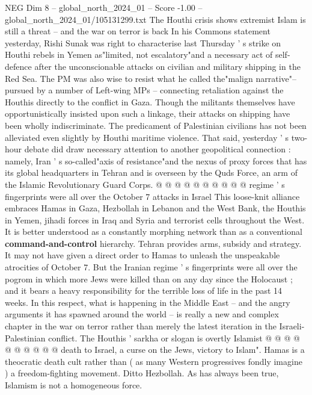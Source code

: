 \begin{textsample}{NEG Dim 8 – global\_north\_2024\_01 – Score -1.00 – global\_north\_2024\_01/105131299.txt}  \label{ex:f8_neg_274}
The Houthi crisis shows extremist Islam is still a threat -- and the war on terror is back In his Commons statement yesterday, Rishi Sunak was right to characterise last Thursday ' s strike on Houthi rebels in Yemen as"limited, not escalatory"and a necessary act of self-defence after the unconscionable attacks on civilian and military shipping in the Red Sea.
The PM was also wise to resist what he called the"malign narrative"-- pursued by a number of Left-wing MPs -- connecting retaliation against the Houthis directly to the conflict in Gaza.
Though the militants themselves have opportunistically insisted upon such a linkage, their attacks on shipping have been wholly indiscriminate.
The predicament of Palestinian civilians has not been alleviated even slightly by Houthi maritime violence.
That said, yesterday ' s two-hour debate did draw necessary attention to another geopolitical connection : namely, Iran ' s so-called"axis of resistance"and the nexus of proxy forces that has its global headquarters in Tehran and is overseen by the Quds Force, an arm of the Islamic Revolutionary Guard Corps. @ @ @ @ @ @ @ @ @ @ regime ' s fingerprints were all over the October 7 attacks in Israel This loose-knit alliance embraces Hamas in Gaza, Hezbollah in Lebanon and the West Bank, the Houthis in Yemen, jihadi forces in Iraq and Syria and terrorist cells throughout the West.
It is better understood as a constantly morphing network than as a conventional \textbf{command-and-control} hierarchy.
Tehran provides arms, subsidy and strategy.
It may not have given a direct order to Hamas to unleash the unspeakable atrocities of October 7.
But the Iranian regime ' s fingerprints were all over the pogrom in which more Jews were killed than on any day since the Holocaust ; and it bears a heavy responsibility for the terrible loss of life in the past 14 weeks.
In this respect, what is happening in the Middle East -- and the angry arguments it has spawned around the world -- is really a new and complex chapter in the war on terror rather than merely the latest iteration in the Israeli-Palestinian conflict.
The Houthis ' sarkha or slogan is overtly Islamist @ @ @ @ @ @ @ @ @ @ death to Israel, a curse on the Jews, victory to Islam".
Hamas is a theocratic death cult rather than ( as many Western progressives fondly imagine ) a freedom-fighting movement.
Ditto Hezbollah.
As has always been true, Islamism is not a homogeneous force.

\end{textsample}
